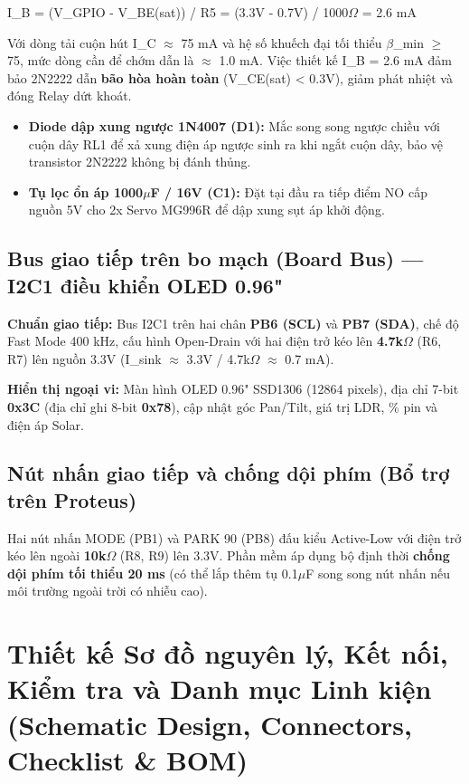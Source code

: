 \documentclass[12pt,a4paper]{report}
\begin{document}
I\_B = (V\_GPIO - V\_BE(sat)) / R5 = (3.3V - 0.7V) / 1000\ensuremath{\Omega} = 2.6 mA

Với dòng tải cuộn hút I\_C \ensuremath{\approx} 75 mA và hệ số khuếch đại tối thiểu \ensuremath{\beta}\_min \ensuremath{\ge} 75, mức dòng cần để chớm dẫn là \ensuremath{\approx} 1.0 mA. Việc thiết kế I\_B = 2.6 mA đảm bảo 2N2222 dẫn \textbf{bão hòa hoàn toàn} (V\_CE(sat) < 0.3V), giảm phát nhiệt và đóng Relay dứt khoát.
\begin{itemize}[leftmargin=1.5em,itemsep=3pt]
  \item \textbf{Diode dập xung ngược 1N4007 (D1):} Mắc song song ngược chiều với cuộn dây RL1 để xả xung điện áp ngược sinh ra khi ngắt cuộn dây, bảo vệ transistor 2N2222 không bị đánh thủng.
  \item \textbf{Tụ lọc ổn áp 1000\ensuremath{\mu}F / 16V (C1):} Đặt tại đầu ra tiếp điểm NO cấp nguồn 5V cho 2x Servo MG996R để dập xung sụt áp khởi động.
\end{itemize}

\subsection{Bus giao tiếp trên bo mạch (Board Bus) --- I2C1 điều khiển OLED 0.96"}

\textbf{Chuẩn giao tiếp:} Bus I2C1 trên hai chân \textbf{PB6 (SCL)} và \textbf{PB7 (SDA)}, chế độ Fast Mode 400 kHz, cấu hình Open-Drain với hai điện trở kéo lên \textbf{4.7k\ensuremath{\Omega}} (R6, R7) lên nguồn 3.3V (I\_sink \ensuremath{\approx} 3.3V / 4.7k\ensuremath{\Omega} \ensuremath{\approx} 0.7 mA).

\textbf{Hiển thị ngoại vi:} Màn hình OLED 0.96" SSD1306 (128\texttimes{}64 pixels), địa chỉ 7-bit \textbf{0x3C} (địa chỉ ghi 8-bit \textbf{0x78}), cập nhật góc Pan/Tilt, giá trị LDR, \% pin và điện áp Solar.

\subsection{Nút nhấn giao tiếp và chống dội phím (Bổ trợ trên Proteus)}

Hai nút nhấn MODE (PB1) và PARK 90\textdegree{} (PB8) đấu kiểu Active-Low với điện trở kéo lên ngoài \textbf{10k\ensuremath{\Omega}} (R8, R9) lên 3.3V. Phần mềm áp dụng bộ định thời \textbf{chống dội phím tối thiểu 20 ms} (có thể lắp thêm tụ 0.1\ensuremath{\mu}F song song nút nhấn nếu môi trường ngoài trời có nhiễu cao).

\section{Thiết kế Sơ đồ nguyên lý, Kết nối, Kiểm tra và Danh mục Linh kiện (Schematic Design, Connectors, Checklist \& BOM)}
\end{document}

